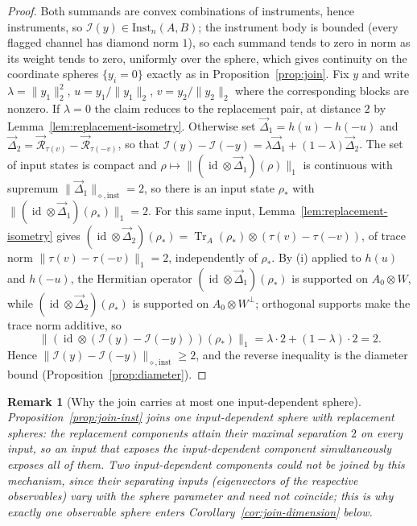 \documentclass[11pt,a4paper]{article}
\newtheorem{remark}[theorem]{Remark}
\newcommand{\Inst}{\mathrm{Inst}}
\newcommand{\Tr}{\operatorname{Tr}}
\newcommand{\id}{\operatorname{id}}
\newcommand{\vD}{\vec{\Delta}}
\begin{document}
\begin{proof}
Both summands are convex combinations of instruments, hence instruments, so $\mathcal I(y)\in\Inst_n(A,B)$; the instrument body is bounded (every flagged channel has diamond norm $1$), so each summand tends to zero in norm as its weight tends to zero, uniformly over the sphere, which gives continuity on the coordinate spheres $\{y_i=0\}$ exactly as in Proposition~\ref{prop:join}. Fix $y$ and write $\lambda=\|y_1\|_2^2$, $u=y_1/\|y_1\|_2$, $v=y_2/\|y_2\|_2$ where the corresponding blocks are nonzero. If $\lambda=0$ the claim reduces to the replacement pair, at distance $2$ by Lemma~\ref{lem:replacement-isometry}. Otherwise set $\vD_1=h(u)-h(-u)$ and $\vD_2=\vec{\mathcal R}_{\tau(v)}-\vec{\mathcal R}_{\tau(-v)}$, so that $\mathcal I(y)-\mathcal I(-y)=\lambda\vD_1+(1-\lambda)\vD_2$. The set of input states is compact and $\rho\mapsto\|(\id\otimes\vD_1)(\rho)\|_1$ is continuous with supremum $\|\vD_1\|_{\diamond,\mathrm{inst}}=2$, so there is an input state $\rho_*$ with $\|(\id\otimes\vD_1)(\rho_*)\|_1=2$. For this same input, Lemma~\ref{lem:replacement-isometry} gives $(\id\otimes\vD_2)(\rho_*)=\Tr_A(\rho_*)\otimes(\tau(v)-\tau(-v))$, of trace norm $\|\tau(v)-\tau(-v)\|_1=2$, independently of $\rho_*$. By (i) applied to $h(u)$ and $h(-u)$, the Hermitian operator $(\id\otimes\vD_1)(\rho_*)$ is supported on $A_0\otimes W$, while $(\id\otimes\vD_2)(\rho_*)$ is supported on $A_0\otimes W^{\perp}$; orthogonal supports make the trace norm additive, so
\[
\big\|(\id\otimes(\mathcal I(y)-\mathcal I(-y)))(\rho_*)\big\|_1
=\lambda\cdot2+(1-\lambda)\cdot2=2.
\]
Hence $\|\mathcal I(y)-\mathcal I(-y)\|_{\diamond,\mathrm{inst}}\ge2$, and the reverse inequality is the diameter bound (Proposition~\ref{prop:diameter}).
\end{proof}

\begin{remark}[Why the join carries at most one input-dependent sphere]
\label{rem:join-one-observable}
Proposition~\ref{prop:join-inst} joins one \emph{input-dependent} sphere with replacement spheres: the replacement components attain their maximal separation $2$ on \emph{every} input, so an input that exposes the input-dependent component simultaneously exposes all of them. Two input-dependent components could not be joined by this mechanism, since their separating inputs (eigenvectors of the respective observables) vary with the sphere parameter and need not coincide; this is why exactly one observable sphere enters Corollary~\ref{cor:join-dimension} below.
\end{remark}
\end{document}
